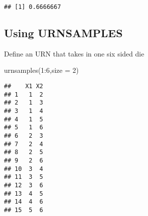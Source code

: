 \documentclass[
]{article}
\newenvironment{Shaded}{\begin{snugshade}}{\end{snugshade}}
\newcommand{\AttributeTok}[1]{\textcolor[rgb]{0.77,0.63,0.00}{#1}}
\newcommand{\DecValTok}[1]{\textcolor[rgb]{0.00,0.00,0.81}{#1}}
\newcommand{\FunctionTok}[1]{\textcolor[rgb]{0.00,0.00,0.00}{#1}}
\newcommand{\NormalTok}[1]{#1}
\newcommand{\SpecialCharTok}[1]{\textcolor[rgb]{0.00,0.00,0.00}{#1}}
\begin{document}
\begin{verbatim}
## [1] 0.6666667
\end{verbatim}

\hypertarget{using-urnsamples}{%
\subsection{Using URNSAMPLES}\label{using-urnsamples}}

Define an URN that takes in one six sided die

\begin{Shaded}
\begin{Highlighting}[]
\FunctionTok{urnsamples}\NormalTok{(}\DecValTok{1}\SpecialCharTok{:}\DecValTok{6}\NormalTok{,}\AttributeTok{size =} \DecValTok{2}\NormalTok{)}
\end{Highlighting}
\end{Shaded}

\begin{verbatim}
##    X1 X2
## 1   1  2
## 2   1  3
## 3   1  4
## 4   1  5
## 5   1  6
## 6   2  3
## 7   2  4
## 8   2  5
## 9   2  6
## 10  3  4
## 11  3  5
## 12  3  6
## 13  4  5
## 14  4  6
## 15  5  6
\end{verbatim}
\end{document}

